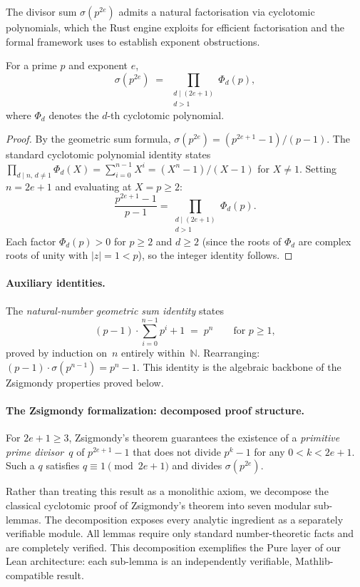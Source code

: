 The divisor sum $\sigma(p^{2e})$ admits a natural factorisation via
cyclotomic polynomials, which the Rust engine exploits for efficient
factorisation and the formal framework uses to establish exponent
obstructions.

\begin{lemma}\label{lem:cyclotomic-expansion}
For a prime $p$ and exponent $e$,
\[
  \sigma(p^{2e}) \;=\; \prod_{\substack{d \mid (2e+1) \\ d > 1}} \Phi_d(p),
\]
where $\Phi_d$ denotes the $d$-th cyclotomic polynomial.
\end{lemma}
\begin{proof}
By the geometric sum formula, $\sigma(p^{2e}) = (p^{2e+1}-1)/(p-1)$.
The standard cyclotomic polynomial identity states
$\prod_{d \mid n,\, d \neq 1} \Phi_d(X) = \sum_{i=0}^{n-1} X^i = (X^n-1)/(X-1)$
for $X \neq 1$.  Setting $n = 2e+1$ and evaluating at $X = p \ge 2$:
\[
  \frac{p^{2e+1}-1}{p-1} = \prod_{\substack{d \mid (2e+1) \\ d > 1}} \Phi_d(p).
\]
Each factor $\Phi_d(p) > 0$ for $p \ge 2$ and $d \ge 2$
(since the roots of $\Phi_d$ are complex roots of unity with $|z|=1 < p$),
so the integer identity follows.
\end{proof}


\paragraph{Auxiliary identities.}
The \emph{natural-number geometric sum identity} states
\[
  (p - 1) \cdot \textstyle\sum_{i=0}^{n-1} p^i + 1 \;=\; p^n
  \qquad \text{for } p \ge 1,
\]
proved by induction on~$n$ entirely within~$\mathbb{N}$.
Rearranging: $(p-1)\cdot\sigma(p^{n-1}) = p^n - 1$.  This identity is the
algebraic backbone of the Zsigmondy properties proved below.


\paragraph{The Zsigmondy formalization: decomposed proof structure.}
For $2e+1 \ge 3$, Zsigmondy's theorem guarantees the existence of a
\emph{primitive prime divisor}~$q$ of $p^{2e+1}-1$ that does not divide
$p^k - 1$ for any $0 < k < 2e+1$.  Such a $q$ satisfies
$q \equiv 1 \pmod{2e+1}$ and divides $\sigma(p^{2e})$.

Rather than treating this result as a monolithic axiom, we decompose the
classical cyclotomic proof of Zsigmondy's theorem into seven modular
sub-lemmas.  The decomposition exposes every analytic ingredient as a
separately verifiable module.  All lemmas require only
standard number-theoretic facts and are completely verified.  This decomposition exemplifies the
Pure layer of our Lean architecture: each sub-lemma is an independently
verifiable, Mathlib-compatible result.


